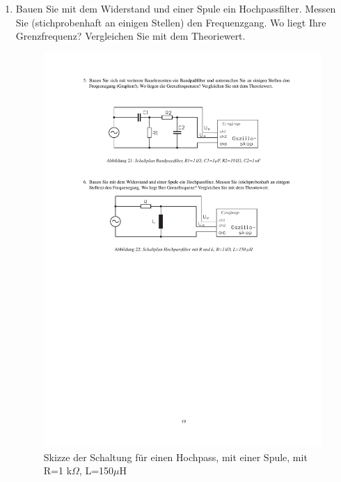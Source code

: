 \documentclass[12pt]{scrartcl}
\begin{document}
\begin{enumerate}
\begin{figure}[htbp]
  \label{fig:Bandpass}
\end{figure}
\item
Bauen Sie mit dem Widerstand und einer Spule ein Hochpassfilter. Messen Sie (stichprobenhaft an einigen Stellen) den Frequenzgang. Wo liegt Ihre Grenzfrequenz? Vergleichen Sie mit dem Theoriewert.
\begin{figure}[htbp] 
  \centering
    \includegraphics[trim = 20mm 155mm 1mm 105mm, clip, scale = 1]{bandpass_hochpass.pdf}
  	\caption[Skizze der Schaltung für einen Hochpass, mit einer Spule, mit R=1 k$\Omega$, L=150$\mu$H]{Skizze der Schaltung für einen Hochpass, mit einer Spule, mit R=1 k$\Omega$, L=150$\mu$H\footnotemark}
  \label{fig:Hochpass_spule}
\end{figure}
\newpage
{}

\end{enumerate}
\end{document}
